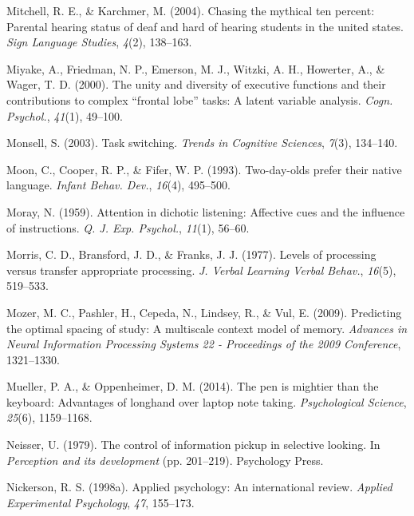 \documentclass[
]{krantz}
\newlength{\cslhangindent}
\newlength{\cslentryspacingunit} %
\newenvironment{CSLReferences}[2] %
 {%
  \setlength{\parindent}{0pt}
  \ifodd #1
  \let\oldpar\par
  \def\par{\hangindent=\cslhangindent\oldpar}
  \fi
  \setlength{\parskip}{#2\cslentryspacingunit}
 }%
 {}
\begin{document}
\begin{CSLReferences}{1}{0}
\leavevmode{}%
Mitchell, R. E., \& Karchmer, M. (2004). Chasing the mythical ten percent: Parental hearing status of deaf and hard of hearing students in the united states. \emph{Sign Language Studies}, \emph{4}(2), 138--163.

\leavevmode{}%
Miyake, A., Friedman, N. P., Emerson, M. J., Witzki, A. H., Howerter, A., \& Wager, T. D. (2000). The unity and diversity of executive functions and their contributions to complex {``frontal lobe''} tasks: A latent variable analysis. \emph{Cogn. Psychol.}, \emph{41}(1), 49--100.

\leavevmode{}%
Monsell, S. (2003). Task switching. \emph{Trends in Cognitive Sciences}, \emph{7}(3), 134--140.

\leavevmode{}%
Moon, C., Cooper, R. P., \& Fifer, W. P. (1993). Two-day-olds prefer their native language. \emph{Infant Behav. Dev.}, \emph{16}(4), 495--500.

\leavevmode{}%
Moray, N. (1959). Attention in dichotic listening: Affective cues and the influence of instructions. \emph{Q. J. Exp. Psychol.}, \emph{11}(1), 56--60.

\leavevmode{}%
Morris, C. D., Bransford, J. D., \& Franks, J. J. (1977). Levels of processing versus transfer appropriate processing. \emph{J. Verbal Learning Verbal Behav.}, \emph{16}(5), 519--533.

\leavevmode{}%
Mozer, M. C., Pashler, H., Cepeda, N., Lindsey, R., \& Vul, E. (2009). Predicting the optimal spacing of study: A multiscale context model of memory. \emph{Advances in Neural Information Processing Systems 22 - Proceedings of the 2009 Conference}, 1321--1330.

\leavevmode{}%
Mueller, P. A., \& Oppenheimer, D. M. (2014). The pen is mightier than the keyboard: Advantages of longhand over laptop note taking. \emph{Psychological Science}, \emph{25}(6), 1159--1168.

\leavevmode{}%
Neisser, U. (1979). The control of information pickup in selective looking. In \emph{Perception and its development} (pp. 201--219). Psychology Press.

\leavevmode{}%
Nickerson, R. S. (1998a). Applied psychology: An international review. \emph{Applied Experimental Psychology}, \emph{47}, 155--173.


\end{CSLReferences}
\end{document}
